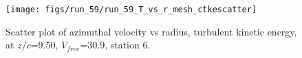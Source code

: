 \begin{figure}[H]
\centering
\texttt{[image: figs/run\_59/run\_59\_T\_vs\_r\_mesh\_ctkescatter]}
\caption{Scatter plot of azimuthal velocity vs radius, turbulent kinetic energy, at $z/c$=9.50, $V_{free}$=30.9, station 6.}
\label{fig:run_59_T_vs_r_mesh_ctkescatter}
\end{figure}


